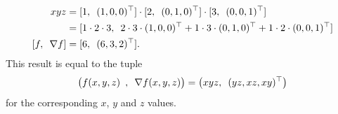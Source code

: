 \begin{align*}
    xyz &= [\adpair{1}{(1,0,0)^\top}]\cdot [\adpair{2}{(0,1,0)^\top}]\cdot
    [\adpair{3}{(0,0,1)^\top}] \\
    &=[\adpair{1\cdot 2\cdot 3}{2\cdot3\cdot(1,0,0)^\top + 1\cdot3\cdot(0,1,0)^\top + 1\cdot2\cdot(0,0,1)^\top}] \\
    [\adpair{f}{\nabla f}] &= [\adpair{6}{(6,3,2)^\top}].
\end{align*}
This result is equal to the tuple
\begin{equation*}
    \big(f(x,y,z) \hspace{0.5em},\hspace{0.5em} \nabla f(x,y,z)\big) = \big(xyz ,\hspace{0.5em} (yz,xz,xy)^\top\big)
\end{equation*}
for the corresponding $x$, $y$ and $z$ values. 
